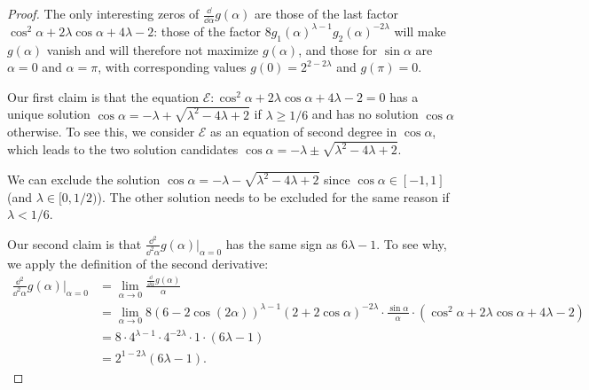 \documentclass[11pt]{llncs}
\begin{document}
\begin{proof}
    The only interesting zeros of $\frac{\dd}{\dd\alpha}g(\alpha)$ are those of the last factor 
    $\cos^2\alpha+2\lambda\cos\alpha+4\lambda-2$: those of the factor $8g_1(\alpha)^{\lambda-1}g_2(\alpha)^{-2\lambda}$ will make $g(\alpha)$ vanish and will therefore not maximize $g(\alpha)$, and those for $\sin\alpha$ are $\alpha=0$ and $\alpha=\pi$, with corresponding values $g(0)=2^{2-2\lambda}$ and $g(\pi)=0$.
    
    Our first claim is that the equation $\mathcal E:\cos^2\alpha+2\lambda\cos\alpha+4\lambda-2=0$ has a unique solution $\cos\alpha=-\lambda+\sqrt{\lambda^2-4\lambda+2}$ if $\lambda\geq 1/6$ and has no solution $\cos\alpha$ otherwise. To see this, we consider $\mathcal E$ as an equation of second degree in $\cos\alpha$, which leads to the two solution candidates $\cos\alpha=-\lambda\pm\sqrt{\lambda^2-4\lambda+2}$.
     
    We can exclude the solution $\cos\alpha=-\lambda-\sqrt{\lambda^2-4\lambda+2}$ since $\cos\alpha\in[-1,1]$ (and $\lambda\in [0,1/2)$). 
    The other solution needs to be excluded for the same reason if $\lambda<1/6$.


    Our second claim is that $\frac{\dd^2}{\dd^2\alpha}g(\alpha)\vert_{\alpha=0}$ has the same sign as $6\lambda -1$. To see why, we apply the definition of the second derivative:
    \begin{align*}
        \frac{\dd^2}{\dd^2\alpha}g(\alpha)\vert_{\alpha=0}
        &=\lim_{\alpha\to 0}\frac{\frac{\dd}{\dd\alpha}g(\alpha)}{\alpha}\\
        &=\lim_{\alpha\to 0}8(6-2\cos(2\alpha))^{\lambda-1}(2+2\cos\alpha)^{-2\lambda}\cdot\frac{\sin\alpha}{\alpha}\cdot\left(\cos^2\alpha+2\lambda\cos\alpha+4\lambda-2\right)\\
        &=8\cdot4^{\lambda-1}\cdot 4^{-2\lambda}\cdot 1\cdot(6\lambda -1)\\
        &=2^{1-2\lambda}(6\lambda -1).
    \end{align*}
    

\end{proof}
\end{document}
